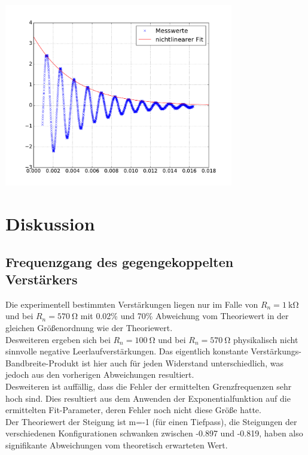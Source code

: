 \documentclass[]{scrartcl}
\let\oldsection\section
\renewcommand\section{\clearpage\oldsection}
\begin{document}
\begin{center}
	\includegraphics[width=10cm]{images/schwing_abfall.pdf}
	\label{fig:expfit}
\end{center}

\section{Diskussion}

\subsection{Frequenzgang des gegengekoppelten Verstärkers}
Die experimentell bestimmten Verstärkungen liegen nur im Falle von $R_n=\SI{1}{\kilo\ohm}$ und bei $R_n=\SI{570}{\ohm}$ mit 0.02\% und 70\% Abweichung vom Theoriewert in der gleichen Größenordnung wie der Theoriewert. \\
Desweiteren ergeben sich bei $R_n=\SI{100}{\ohm}$ und bei $R_n=\SI{570}{\ohm}$ physikalisch nicht sinnvolle negative Leerlaufverstärkungen. Das eigentlich konstante Verstärkungs-Bandbreite-Produkt ist hier auch für jeden Widerstand unterschiedlich, was jedoch aus den vorherigen Abweichungen resultiert. \\
Desweiteren ist auffällig, dass die Fehler der ermittelten Grenzfrequenzen sehr hoch sind. Dies resultiert aus dem Anwenden der Exponentialfunktion auf die ermittelten Fit-Parameter, deren Fehler noch nicht diese Größe hatte. \\
Der Theoriewert der Steigung ist m=-1 (für einen Tiefpass), die Steigungen der verschiedenen Konfigurationen schwanken zwischen -0.897 und -0.819, haben also signifikante Abweichungen vom theoretisch erwarteten Wert.
\end{document}
